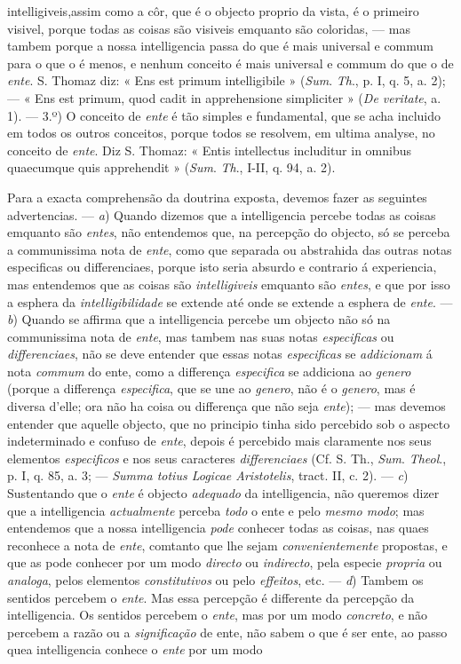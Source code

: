 intelligiveis,assim como a côr, que é o objecto proprio da vista, é o primeiro visivel, porque todas as coisas são visiveis emquanto são coloridas, --- mas tambem porque a nossa intelligencia passa do que é mais universal e commum para o que o é menos, e nenhum conceito é mais universal e commum do que o de \emph{ente}. S. Thomaz diz: « Ens est primum intelligibile » (\emph{Sum}. \emph{Th}., p. I, q. 5, a. 2); --- « Ens est primum, quod cadit in apprehensione simpliciter » (\emph{De veritate}, a. 1). --- 3.º) O conceito de \emph{ente} é tão simples e fundamental, que se acha incluido em todos os outros conceitos, porque todos se resolvem, em ultima analyse, no conceito de \emph{ente}. Diz S. Thomaz: « Entis intellectus includitur in omnibus quaecumque quis apprehendit » (\emph{Sum}. \emph{Th}., I-II, q. 94, a. 2).\par Para a exacta comprehensão da doutrina exposta, devemos fazer as seguintes advertencias. --- \emph{a}) Quando dizemos que a intelligencia percebe todas as coisas emquanto são \emph{entes}, não entendemos que, na percepção do objecto, só se perceba a communissima nota de \emph{ente}, como que separada ou abstrahida das outras notas especificas ou differenciaes, porque isto seria absurdo e contrario á experiencia, mas entendemos que as coisas são \emph{intelligiveis} emquanto são \emph{entes}, e que por isso a esphera da \emph{intelligibilidade} se extende até onde se extende a esphera de \emph{ente}. --- \emph{b}) Quando se affirma que a intelligencia percebe um objecto não só na communissima nota de \emph{ente}, mas tambem nas suas notas \emph{especificas} ou \emph{differenciaes}, não se deve entender que essas notas \emph{especificas} se \emph{addicionam} á nota \emph{commum} do ente, como a differença \emph{especifica} se addiciona ao \emph{genero} (porque a differença \emph{especifica}, que se une ao \emph{genero}, não é o \emph{genero}, mas é diversa d'elle; ora não ha coisa ou differença que não seja \emph{ente}); --- mas devemos entender que aquelle objecto, que no principio tinha sido percebido sob o aspecto indeterminado e confuso de \emph{ente}, depois é percebido mais claramente nos seus elementos \emph{especificos} e nos seus caracteres \emph{differenciaes} (Cf. S. Th., \emph{Sum}. \emph{Theol}., p. I, q. 85, a. 3; --- \emph{Summa totius Logicae Aristotelis}, tract. II, c. 2). --- \emph{c}) Sustentando que o \emph{ente} é objecto \emph{adequado} da intelligencia, não queremos dizer que a intelligencia \emph{actualmente} perceba \emph{todo} o ente e pelo \emph{mesmo modo}; mas entendemos que a nossa intelligencia \emph{pode} conhecer todas as coisas, nas quaes reconhece a nota de \emph{ente}, comtanto que lhe sejam \emph{convenientemente} propostas, e que as pode conhecer por um modo \emph{directo} ou \emph{indirecto}, pela especie \emph{propria} ou \emph{analoga}, pelos elementos \emph{constitutivos} ou pelo \emph{effeitos}, etc. --- \emph{d}) Tambem os sentidos percebem o \emph{ente}. Mas essa percepção é differente da percepção da intelligencia. Os sentidos percebem o \emph{ente}, mas por um modo \emph{concreto}, e não percebem a razão ou a \emph{significação} de ente, não sabem o que é ser ente, ao passo quea intelligencia conhece o \emph{ente} por um modo 